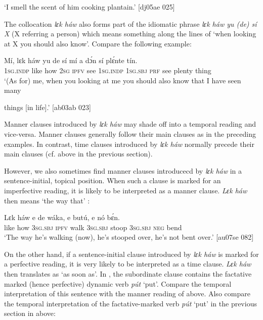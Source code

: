 \glt ‘I smell the scent of him cooking plantain.’ [dj05ae 025]
\z

The collocation \textit{lɛk háw} also forms part of the idiomatic phrase \textit{lɛk háw yu (de) sí X} (X referring a person) which means something along the lines of ‘when looking at X you should also know’. Compare the following example: 


\ea%
    \label{ex:key:1485}
    \gll Mí,    lɛk  háw    yu  de  sí  mí    a    dɔ́n  sí  plɛ́nte  tín.\\
\textsc{1sg.indp}  like  how    \textsc{2sg}  \textsc{ipfv}  see  \textsc{1sg.indp}  \textsc{1sg.sbj}  \textsc{prf}  see  plenty  thing\\

\glt ‘(As for) me, when you looking at me you should also know that I have seen many 


\glt things [in life].’ [ab03ab 023]
\z

Manner clauses introduced by \textit{lɛk háw} may shade off into a temporal reading and vice-versa. Manner clauses generally follow their main clauses as in the preceding examples. In contrast, time clauses introduced by\textit{ lɛk háw} normally precede their main clauses (cf.  above in the previous section).


However, we also sometimes find manner clauses introducecd by \textit{lɛk háw} in a sentence-initial, topical position. When such a clause is marked for an imperfective reading, it is likely to be interpreted as a manner clause. \textit{Lɛk háw} then means ‘the way that’ : 



\ea%
    \label{ex:key:1486}
    \gll Lɛk  háw    e    de  wáka,  e    butú,  e    nó  bɛ́n.\\
like  how    \textsc{3sg.sbj}  \textsc{ipfv}  walk  \textsc{3sg.sbj}  stoop  \textsc{3sg.sbj}  \textsc{neg}  bend\\

\glt ‘The way he’s walking (now), he’s stooped over, he’s not bent over.’ [au07se 082]
\z

On the other hand, if a sentence-initial clause introduced by \textit{lɛk háw} is marked for a perfective reading, it is very likely to be interpreted as a time clause. \textit{Lɛk háw} then translates as ‘as soon as’. In , the subordinate clause contains the factative marked (hence perfective) dynamic verb \textit{pút} ‘put’. Compare the temporal interpretation of this sentence with the manner reading of  above. Also compare the temporal interpretation of the factative-marked verb \textit{pút} ‘put’ in the previous section in  above:


